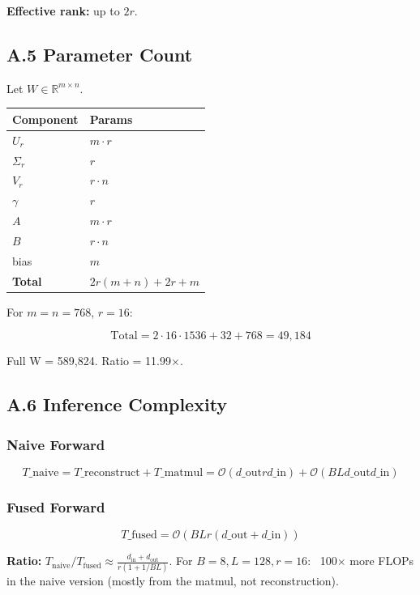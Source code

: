 \textbf{Effective rank:} up to $2r$.

\subsection{A.5 Parameter Count}

Let $W \in \mathbb{R}^{m \times n}$.

\begin{table}[H]
\centering
\small
\begin{tabular}{ll}
\toprule
\textbf{Component} & \textbf{Params} \\
\midrule
$U_r$ & $m \cdot r$ \\
$\Sigma_r$ & $r$ \\
$V_r$ & $r \cdot n$ \\
$\gamma$ & $r$ \\
$A$ & $m \cdot r$ \\
$B$ & $r \cdot n$ \\
bias & $m$ \\
\textbf{Total} & $2r(m + n) + 2r + m$ \\
\bottomrule
\end{tabular}
\end{table}

For $m = n = 768$, $r = 16$:

\[
\text{Total} = 2 \cdot 16 \cdot 1536 + 32 + 768 = 49,184
\tag{A.4}
\]

Full W = 589,824. Ratio = 11.99$\times$.

\subsection{A.6 Inference Complexity}

\subsubsection{Naive Forward}

\[
T\_\text{naive} = T\_\text{reconstruct} + T\_\text{matmul} = \mathcal{O}(d\_\text{out} r d\_\text{in}) + \mathcal{O}(BL d\_\text{out} d\_\text{in})
\tag{A.5}
\]

\subsubsection{Fused Forward}

\[
T\_\text{fused} = \mathcal{O}(BL r (d\_\text{out} + d\_\text{in}))
\tag{A.6}
\]

\textbf{Ratio:} $T_\text{naive} / T_\text{fused} \approx \frac{d_\text{in} + d_\text{out}}{r (1 + 1/BL)}$. 
For $B = 8, L = 128, r = 16$: ~100$\times$ more FLOPs in the naive version (mostly 
from the matmul, not reconstruction).

